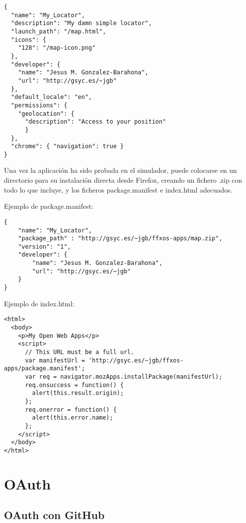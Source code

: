 \begin{verbatim}
{
  "name": "My_Locator",
  "description": "My damn simple locator",
  "launch_path": "/map.html",
  "icons": {
    "128": "/map-icon.png"
  },
  "developer": {
    "name": "Jesus M. Gonzalez-Barahona",
    "url": "http://gsyc.es/~jgb"
  },
  "default_locale": "en",
  "permissions": {
    "geolocation": {
      "description": "Access to your position"
      }
  },
  "chrome": { "navigation": true }
}
\end{verbatim}

Una vez la aplicación ha sido probada en el simulador, puede colocarse en un directorio para su instalación directa desde Firefox, creando un fichero .zip con todo lo que incluye, y los ficheros package.manifest e index.html adecuados.

Ejemplo de package.manifest:

\begin{verbatim}
{
    "name": "My_Locator",
    "package_path" : "http://gsyc.es/~jgb/ffxos-apps/map.zip",
    "version": "1",
    "developer": {
        "name": "Jesus M. Gonzalez-Barahona",
        "url": "http://gsyc.es/~jgb"
    }
}
\end{verbatim}

Ejemplo de index.html:

\begin{verbatim}
<html>
  <body>
    <p>My Open Web Apps</p>
    <script>
      // This URL must be a full url.
      var manifestUrl = 'http://gsyc.es/~jgb/ffxos-apps/package.manifest';
      var req = navigator.mozApps.installPackage(manifestUrl);
      req.onsuccess = function() {
        alert(this.result.origin);
      };
      req.onerror = function() {
        alert(this.error.name);
      };
    </script>
  </body>
</html>
\end{verbatim}


\section{OAuth}

\subsection{OAuth con GitHub}
\label{subsec:oauth-github}

